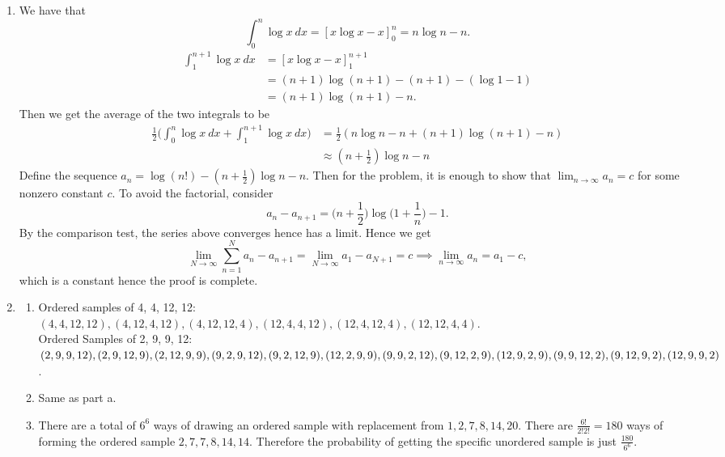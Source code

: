 \documentclass{article}
\begin{document}
\begin{enumerate}
    \item We have that 
    \[ \int_{0}^{n} \log{x} \ dx = [x\log{x} - x]_{0}^{n} = n\log{n} - n. \]
    \begin{align*}
        \int_{1}^{n + 1} \log{x} \ dx 
        &= [x\log{x} - x]_{1}^{n + 1} \\
        &= (n + 1)\log{(n + 1)} - (n + 1) - (\log{1} - 1) \\
        &= (n + 1)\log{(n + 1)} - n.
    \end{align*}
    Then we get the average of the two integrals to be 
    \begin{align*}
        \frac{1}{2} \Big( \int_{0}^{n} \log{x} \ dx + \int_{1}^{n + 1} \log{x} \ dx \Big)
        &= \frac{1}{2}(n\log{n} - n + (n + 1)\log{(n + 1)} - n) \\
        &\approx (n + \frac{1}{2})\log{n} - n
    \end{align*}
    Define the sequence $a_n = \log{(n!)} - (n + \frac{1}{2})\log{n} - n$. Then for the 
    problem, it is enough to show that $\lim_{n \to \infty} a_n = c$ for some nonzero constant 
    $c$. To avoid the factorial, consider 
    \[ a_n - a_{n + 1} = \Big( n + \frac{1}{2})\log{\Big(1 + \frac{1}{n} \Big)} - 1. \]
    By the comparison test, the series above converges hence has a limit. Hence we get 
    \[ \lim_{N \to \infty} \sum_{n = 1}^{N} a_n - a_{n + 1} 
    = \lim_{N \to \infty} a_1 - a_{N + 1} = c \implies \lim_{n \to \infty} a_n = a_1 - c, \]
    which is a constant hence the proof is complete.

    \item \begin{enumerate}
        \item Ordered samples of {4, 4, 12, 12}: \\
        $(4, 4, 12, 12), (4, 12, 4, 12), (4, 12, 12, 4), (12, 4, 4, 12), (12, 4, 12, 4), 
        (12, 12, 4, 4)$. \\
        Ordered Samples of {2, 9, 9, 12}: \\
        $(2, 9, 9, 12), (2, 9, 12, 9), (2, 12, 9, 9), (9, 2, 9, 12), (9, 2, 12, 9), 
        (12, 2, 9, 9), \\ (9, 9, 2, 12), (9, 12, 2, 9), (12, 9, 2, 9), (9, 9, 12, 2), 
        (9, 12, 9, 2), (12, 9, 9, 2)$.

        \item Same as part a.
        
        \item There are a total of $6^6$ ways of drawing an ordered sample with replacement from 
        ${1, 2, 7, 8, 14, 20}$. There are $\frac{6!}{2!2!} = 180$ ways of forming the ordered 
        sample ${2, 7, 7, 8, 14, 14}$. Therefore the probability of getting the specific 
        unordered sample is just $\frac{180}{6^6}$. 


\end{enumerate}
\end{enumerate}
\end{document}
